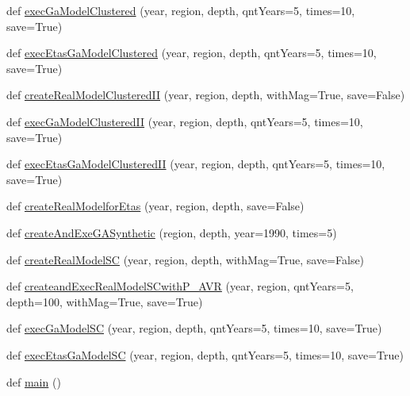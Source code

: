 \begin{DoxyCompactItemize}
\item 
def \hyperlink{namespacecode_1_1apply_ga_model_a5838725be7016f41093fe1702ecca97e}{exec\+Ga\+Model\+Clustered} (year, region, depth, qnt\+Years=5, times=10, save=True)
\item 
def \hyperlink{namespacecode_1_1apply_ga_model_afb33e707c410781ea9bade622ac7a2a3}{exec\+Etas\+Ga\+Model\+Clustered} (year, region, depth, qnt\+Years=5, times=10, save=True)
\item 
def \hyperlink{namespacecode_1_1apply_ga_model_a5b912584423540d386d79d90e4382d14}{create\+Real\+Model\+Clustered\+II} (year, region, depth, with\+Mag=True, save=False)
\item 
def \hyperlink{namespacecode_1_1apply_ga_model_ae7b55f3e8470d957107bbc092724a75a}{exec\+Ga\+Model\+Clustered\+II} (year, region, depth, qnt\+Years=5, times=10, save=True)
\item 
def \hyperlink{namespacecode_1_1apply_ga_model_adb4f83dfa0efd98ff16aa155d9393a78}{exec\+Etas\+Ga\+Model\+Clustered\+II} (year, region, depth, qnt\+Years=5, times=10, save=True)
\item 
def \hyperlink{namespacecode_1_1apply_ga_model_a5f392b173052cddbd7db5e85185575b8}{create\+Real\+Modelfor\+Etas} (year, region, depth, save=False)
\item 
def \hyperlink{namespacecode_1_1apply_ga_model_a94f1c9ee8f252ef24653366e6206e4b8}{create\+And\+Exe\+G\+A\+Synthetic} (region, depth, year=1990, times=5)
\item 
def \hyperlink{namespacecode_1_1apply_ga_model_a01ab17f5193cbafa683032106b0f32d7}{create\+Real\+Model\+SC} (year, region, depth, with\+Mag=True, save=False)
\item 
def \hyperlink{namespacecode_1_1apply_ga_model_a6b580b2078c64bf88da378552a3eb142}{createand\+Exec\+Real\+Model\+S\+Cwith\+P\+\_\+\+A\+VR} (year, region, qnt\+Years=5, depth=100, with\+Mag=True, save=True)
\item 
def \hyperlink{namespacecode_1_1apply_ga_model_aa9856a6798d0988ba7e7109625908d66}{exec\+Ga\+Model\+SC} (year, region, depth, qnt\+Years=5, times=10, save=True)
\item 
def \hyperlink{namespacecode_1_1apply_ga_model_a439bc0f7eb30f835b2f4bc458adfde50}{exec\+Etas\+Ga\+Model\+SC} (year, region, depth, qnt\+Years=5, times=10, save=True)
\item 
def \hyperlink{namespacecode_1_1apply_ga_model_a245f2986f00dbb050a839ed2947a5780}{main} ()
\end{DoxyCompactItemize}


